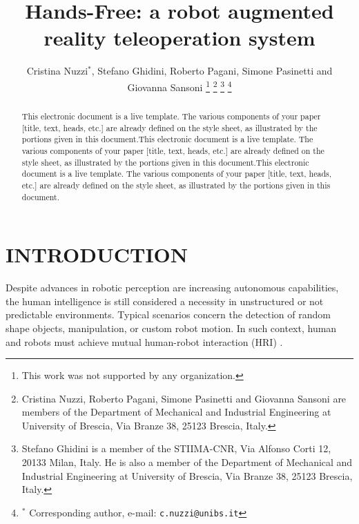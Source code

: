 \documentclass[letterpaper, 10 pt, conference]{ieeeconf}  %
\title{\LARGE \bf
Hands-Free: a robot augmented reality teleoperation system
}
\author{Cristina Nuzzi$^{*}$, Stefano Ghidini, Roberto Pagani, Simone Pasinetti and Giovanna Sansoni %
\thanks{This work was not supported by any organization.}%
\thanks{Cristina Nuzzi, Roberto Pagani, Simone Pasinetti and Giovanna Sansoni are members of the Department of Mechanical and Industrial Engineering at University of Brescia, Via Branze 38, 25123 Brescia, Italy.}
\thanks{Stefano Ghidini is a member of the STIIMA-CNR, Via Alfonso Corti 12, 20133 Milan, Italy. He is also a member of the Department of Mechanical and Industrial Engineering at University of Brescia, Via Branze 38, 25123 Brescia, Italy.}
\thanks{$^{*}$ Corresponding author, e-mail: {\tt\small c.nuzzi@unibs.it}}%
}
\begin{document}
\maketitle
\thispagestyle{empty}
\pagestyle{empty}

\begin{abstract}

This electronic document is a live template. The various components of your paper [title, text, heads, etc.] are already defined on the style sheet, as illustrated by the portions given in this document.This electronic document is a live template. The various components of your paper [title, text, heads, etc.] are already defined on the style sheet, as illustrated by the portions given in this document.This electronic document is a live template. The various components of your paper [title, text, heads, etc.] are already defined on the style sheet, as illustrated by the portions given in this document.


\end{abstract}


\section{INTRODUCTION}
Despite advances in robotic perception are increasing autonomous capabilities, the human intelligence is still considered a necessity in unstructured or not predictable environments. Typical scenarios concern the detection of random shape objects, manipulation, or custom robot motion. In such context, human and robots must achieve mutual human-robot interaction (HRI) \cite{Yanco2002}.
\end{document}
